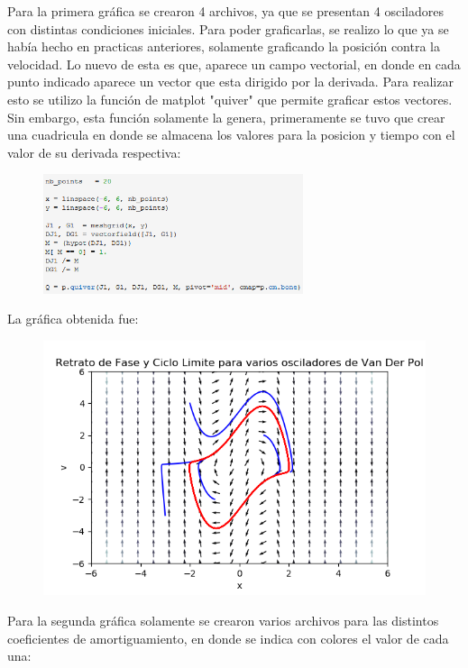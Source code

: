 \documentclass[12pt]{article}
\begin{document}
\pagebreak

Para la primera gráfica se crearon 4 archivos, ya que se presentan 4 osciladores con distintas condiciones iniciales. Para poder graficarlas, se realizo lo que ya se había hecho en practicas anteriores, solamente graficando la posición contra la velocidad. Lo nuevo de esta es que, aparece un campo vectorial, en donde en cada punto indicado aparece un vector que esta dirigido por la derivada. Para realizar esto se utilizo la función de matplot "quiver" que permite graficar estos vectores. Sin embargo, esta función solamente la genera, primeramente se tuvo que crear una cuadricula en donde se almacena los valores para la posicion y tiempo con el valor de su derivada respectiva: 

\begin{figure}[h!]
    \centering
\includegraphics[width=3in]{Cod2.png}
\end{figure}

La gráfica obtenida fue:

\begin{figure}[h!]
    \centering
\includegraphics[width=5in]{Im1.png}
\end{figure}

Para la segunda gráfica solamente se crearon varios archivos para las distintos coeficientes de amortiguamiento, en donde se indica con colores el valor de cada una:
\end{document}

